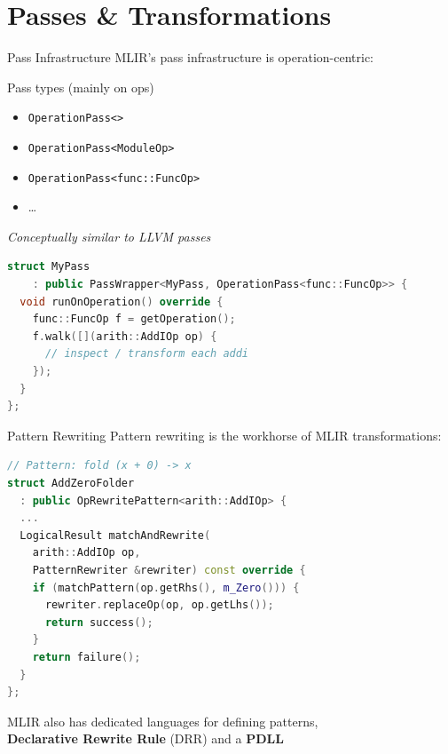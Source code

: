 \section{Passes \& Transformations}


\begin{frame}[fragile,shrink=5]{Pass Infrastructure}
  \bigskip
  MLIR's pass infrastructure is operation-centric:
  
  \begin{block}{Pass types (mainly on ops)}
    \begin{itemize}
      \item \texttt{OperationPass<>}
      \item \texttt{OperationPass<ModuleOp>}
      \item \texttt{OperationPass<func::FuncOp>}
      \item \ldots
    \end{itemize}
  \end{block}

  \textit{\small Conceptually similar to LLVM passes}

  \begin{lstlisting}[language=C++,basicstyle=\ttfamily\small]
struct MyPass
    : public PassWrapper<MyPass, OperationPass<func::FuncOp>> {
  void runOnOperation() override {
    func::FuncOp f = getOperation();
    f.walk([](arith::AddIOp op) {
      // inspect / transform each addi
    });
  }
};
  \end{lstlisting}
\end{frame}


\begin{frame}[fragile]{Pattern Rewriting}
  \bigskip
  Pattern rewriting is the workhorse of MLIR transformations:

\begin{lstlisting}[language=C++,basicstyle=\ttfamily\small]
// Pattern: fold (x + 0) -> x
struct AddZeroFolder
  : public OpRewritePattern<arith::AddIOp> {
  ...
  LogicalResult matchAndRewrite(
    arith::AddIOp op,
    PatternRewriter &rewriter) const override {
    if (matchPattern(op.getRhs(), m_Zero())) {
      rewriter.replaceOp(op, op.getLhs());
      return success();
    }
    return failure();
  }
};
\end{lstlisting}

  MLIR also has dedicated languages for defining patterns,\\
  \textbf{Declarative Rewrite Rule} (DRR) and a \textbf{PDLL}
\end{frame}


